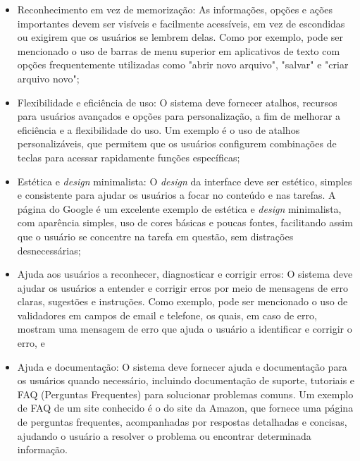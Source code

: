\begin{description}
\begin{itemize}
            \item Reconhecimento em vez de memorização: As informações, opções e ações importantes devem ser visíveis e 
            facilmente acessíveis, em vez de escondidas ou exigirem que os usuários se lembrem delas. Como por exemplo, pode ser mencionado 
            o uso de barras de menu superior em aplicativos de texto com opções frequentemente utilizadas como "abrir novo arquivo", "salvar" e "criar 
            arquivo novo";

            \item Flexibilidade e eficiência de uso: O sistema deve fornecer atalhos, recursos para usuários avançados e 
            opções para personalização, a fim de melhorar a eficiência e a flexibilidade do uso. Um exemplo é o uso de atalhos personalizáveis, que 
            permitem que os usuários configurem combinações de teclas para acessar rapidamente funções específicas;

            \item Estética e \textit{design} minimalista: O \textit{design} da interface deve ser estético, simples e consistente para ajudar
             os usuários a focar no conteúdo e nas tarefas. A página do Google é um excelente exemplo de estética e \textit{design} minimalista, com aparência simples, 
             uso de cores básicas e poucas fontes, facilitando assim que o usuário se concentre na tarefa em questão, sem distrações desnecessárias; 
            
            \item Ajuda aos usuários a reconhecer, diagnosticar e corrigir erros: O sistema deve ajudar os usuários a entender e corrigir erros por meio de mensagens 
            de erro claras, sugestões e instruções. Como exemplo, pode ser mencionado o uso de validadores em campos de email e telefone, os quais, em caso de erro, 
            mostram uma mensagem de erro que ajuda o usuário a identificar e corrigir o erro, e

            \item Ajuda e documentação: O sistema deve fornecer ajuda e documentação para os usuários quando necessário, incluindo 
            documentação de suporte, tutoriais e FAQ (Perguntas Frequentes) para solucionar problemas comuns. Um exemplo de FAQ de um site conhecido é o do site da 
            Amazon, que fornece uma página de perguntas frequentes, acompanhadas por respostas detalhadas e concisas, ajudando o usuário a resolver o problema ou encontrar 
            determinada informação.
        \end{itemize}
\end{description}

